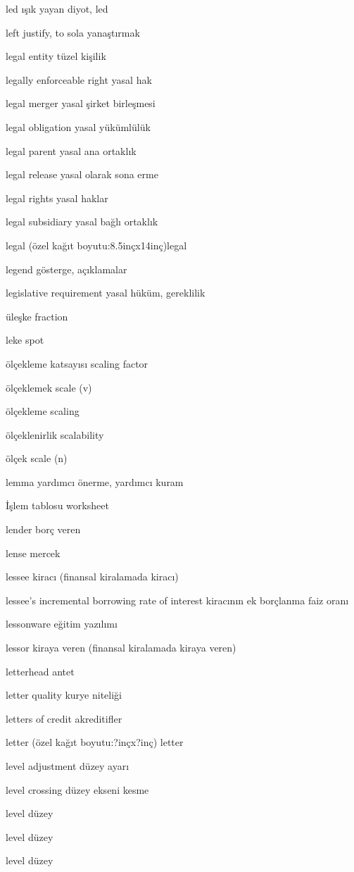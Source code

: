 \documentclass[12pt,fleqn]{article}\usepackage{../../common}
\begin{document}
led ışık yayan diyot, led

left justify, to sola yanaştırmak

legal entity tüzel kişilik

legally enforceable right yasal hak

legal merger yasal şirket birleşmesi

legal obligation yasal yükümlülük

legal parent yasal ana ortaklık

legal release yasal olarak sona erme

legal rights yasal haklar

legal subsidiary yasal bağlı ortaklık

legal (özel kağıt boyutu:8.5inçx14inç)legal

legend gösterge, açıklamalar

legislative requirement yasal hüküm, gereklilik

üleşke fraction

leke spot

ölçekleme katsayısı scaling factor

ölçeklemek scale (v)

ölçekleme scaling

ölçeklenirlik scalability

ölçek scale (n)

lemma yardımcı önerme, yardımcı kuram

İşlem tablosu worksheet

lender borç veren

lense mercek

lessee kiracı (finansal kiralamada kiracı)

lessee's incremental borrowing rate of interest kiracının ek borçlanma faiz oranı

lessonware eğitim yazılımı

lessor kiraya veren (finansal kiralamada kiraya veren)

letterhead antet

letter quality kurye niteliği

letters of credit akreditifler

letter (özel kağıt boyutu:?inçx?inç) letter

level adjustment düzey ayarı

level crossing düzey ekseni kesme

level düzey

level düzey

level düzey
\end{document}
